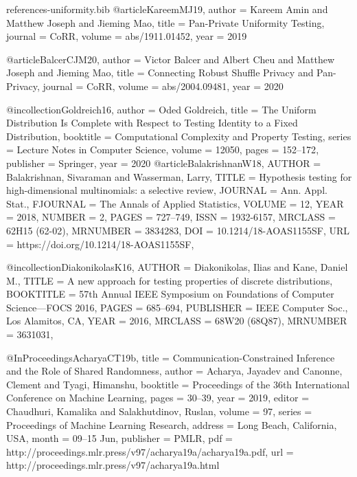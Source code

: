 \documentclass[10pt]{article}
\begin{document}
\begin{filecontents}{references-uniformity.bib}
@article{KareemMJ19,
  author    = {Kareem Amin and
               Matthew Joseph and
               Jieming Mao},
  title     = {Pan-Private Uniformity Testing},
  journal   = {CoRR},
  volume    = {abs/1911.01452},
  year      = {2019}
}

@article{BalcerCJM20,
  author    = {Victor Balcer and
               Albert Cheu and
               Matthew Joseph and
               Jieming Mao},
  title     = {Connecting Robust Shuffle Privacy and Pan-Privacy},
  journal   = {CoRR},
  volume    = {abs/2004.09481},
  year      = {2020}
}

@incollection{Goldreich16,
  author    = {Oded Goldreich},
  title     = {The Uniform Distribution Is Complete with Respect to Testing Identity
               to a Fixed Distribution},
  booktitle = {Computational Complexity and Property Testing},
  series    = {Lecture Notes in Computer Science},
  volume    = {12050},
  pages     = {152--172},
  publisher = {Springer},
  year      = {2020}
}
@article{BalakrishnanW18,
    AUTHOR = {Balakrishnan, Sivaraman and Wasserman, Larry},
     TITLE = {Hypothesis testing for high-dimensional multinomials: a
              selective review},
   JOURNAL = {Ann. Appl. Stat.},
  FJOURNAL = {The Annals of Applied Statistics},
    VOLUME = {12},
      YEAR = {2018},
    NUMBER = {2},
     PAGES = {727--749},
      ISSN = {1932-6157},
   MRCLASS = {62H15 (62-02)},
  MRNUMBER = {3834283},
       DOI = {10.1214/18-AOAS1155SF},
       URL = {https://doi.org/10.1214/18-AOAS1155SF},
}

@incollection{DiakonikolasK16,
    AUTHOR = {Diakonikolas, Ilias and Kane, Daniel M.},
     TITLE = {A new approach for testing properties of discrete
              distributions},
 BOOKTITLE = {57th {A}nnual {IEEE} {S}ymposium on {F}oundations of
              {C}omputer {S}cience---{FOCS} 2016},
     PAGES = {685--694},
 PUBLISHER = {IEEE Computer Soc., Los Alamitos, CA},
      YEAR = {2016},
   MRCLASS = {68W20 (68Q87)},
  MRNUMBER = {3631031},
}

@InProceedings{AcharyaCT19b,
  title = 	 {Communication-Constrained Inference and the Role of Shared Randomness},
  author = 	 {Acharya, Jayadev and Canonne, Clement and Tyagi, Himanshu},
  booktitle = 	 {Proceedings of the 36th International Conference on Machine Learning},
  pages = 	 {30--39},
  year = 	 {2019},
  editor = 	 {Chaudhuri, Kamalika and Salakhutdinov, Ruslan},
  volume = 	 {97},
  series = 	 {Proceedings of Machine Learning Research},
  address = 	 {Long Beach, California, USA},
  month = 	 {09--15 Jun},
  publisher = 	 {PMLR},
  pdf = 	 {http://proceedings.mlr.press/v97/acharya19a/acharya19a.pdf},
  url = 	 {http://proceedings.mlr.press/v97/acharya19a.html}
}


\end{filecontents}
\end{document}
